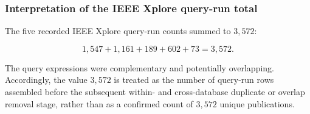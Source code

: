 \documentclass[12pt]{article}
\numberwithin{equation}{section}
\begin{document}
\subsubsection{Interpretation of the IEEE Xplore query-run total}

The five recorded IEEE Xplore query-run counts summed to
\(3{,}572\):

\[
1{,}547+1{,}161+189+602+73=3{,}572.
\]

The query expressions were complementary and potentially overlapping.
Accordingly, the value \(3{,}572\) is treated as the number of
query-run rows assembled before the subsequent within- and
cross-database duplicate or overlap removal stage, rather than as a
confirmed count of \(3{,}572\) unique publications.

\clearpage





\end{document}
